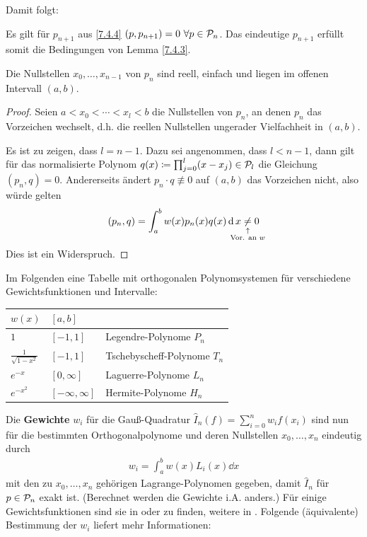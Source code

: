 Damit folgt:


\begin{Kore}
  \label{7.4.5}
  Es gilt für $p_{n+1}$ aus \ref{7.4.4} $(p,p_{n+1})=0~\forall p\in\mathcal{P}_n$.
  Das eindeutige $p_{n+1}$ erfüllt somit die
  Bedingungen von Lemma \ref{7.4.3}.
\end{Kore}


\begin{Satze}
  Die Nullstellen $x_0,\dotsc,x_{n-1}$ von $p_n$
  sind reell, einfach und liegen im offenen Intervall $(a,b)$.
  \begin{proof}
    Seien $a<x_0<\dotsb<x_l<b$ die Nullstellen von $p_n$,
    an denen $p_n$ das Vorzeichen wechselt,
    d.h. die reellen Nullstellen ungerader Vielfachheit in $(a,b)$.

    Es ist zu zeigen, dass $l=n-1$.
    Dazu sei angenommen, dass $l<n-1$, 
    dann gilt für das normalisierte Polynom
    $q(x)\coloneqq \prod_{j=0}^{l}(x-x_j)\in\mathcal{P}_l$ die
    Gleichung $(p_n,q)=0$.
    Andererseits ändert $p_n\cdot q\not\equiv 0$ 
    auf $(a,b)$ das  Vorzeichen nicht, also würde gelten
    \begin{gather*}
      (p_n,q)=\int_a^bw(x)p_n(x)q(x)\dd x
      \underset{\mathclap{\substack{\uparrow\\\text{Vor. an $w$}}}}{\neq} 0
    \end{gather*}
    Dies ist ein Widerspruch.
  \end{proof}
\end{Satze}

\begin{Bspe}
  Im Folgenden eine Tabelle mit orthogonalen Polynomsystemen
  für verschiedene Gewichtsfunktionen und Intervalle:
  
  \begin{tabularx}{0.5\linewidth}{@{}lll@{}}
    $w(x)$ & $[a,b]$ \\
    \midrule
    $1$    & $[-1,1]$ & Legendre-Polynome $P_n$\\
    $\frac{1}{\sqrt{1-x^2}}$ & $[-1,1]$ & Tschebyscheff-Polynome $T_n$\\
    $e^{-x}$ & $[0,\infty]$ & Laguerre-Polynome $L_n$\\
    $e^{-x^2}$ & $[-\infty,\infty]$ & Hermite-Polynome $H_n$
    \end{tabularx}
\end{Bspe}
    Die \textbf{Gewichte} $w_i$ 
    für die Gauß-Quadratur $\hat{I}_n(f)=\sum_{i=0}^{n}w_if(x_i)$
    sind nun für die bestimmten Orthogonalpolynome 
    und deren Nullstellen $x_0,\dotsc,x_n$ eindeutig durch
    \begin{gather}
      w_i=\int_a^b w(x)L_i(x)\dd x
      \label{VII.4.5}
    \end{gather}
    mit den zu $x_0,\dotsc, x_n$ gehörigen Lagrange-Polynomen gegeben,
    damit $\hat{I}_n$ für $p\in \mathcal{P}_n$ exakt ist.
    (Berechnet werden die Gewichte i.A. anders.)
    Für einige Gewichtsfunktionen sind sie in 
    \cite{stoer} oder \cite{haemmerlinhoffmann} zu finden,
    weitere in \cite{abramowitzstegun}.
    Folgende (äquivalente) Bestimmung der $w_i$ liefert mehr Informationen:

